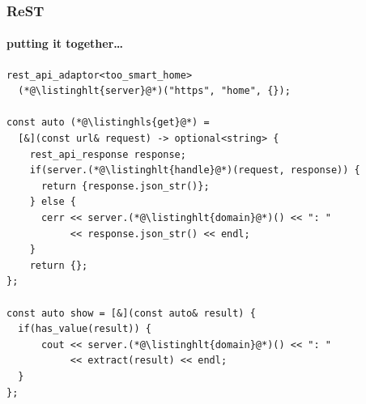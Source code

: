 \documentclass[compress,table,xcolor=table]{beamer}
\begin{document}
\begin{frame}[fragile]
  \frametitle{ReST}
  \framesubtitle{putting it together\ldots}
  \begin{lstlisting}[language=c++2x,basicstyle=\scriptsize\ttfamily]
rest_api_adaptor<too_smart_home>
  (*@\listinghlt{server}@*)("https", "home", {});

const auto (*@\listinghls{get}@*) =
  [&](const url& request) -> optional<string> {
    rest_api_response response;
    if(server.(*@\listinghlt{handle}@*)(request, response)) {
      return {response.json_str()};
    } else {
      cerr << server.(*@\listinghlt{domain}@*)() << ": "
           << response.json_str() << endl;
    }
    return {};
};

const auto show = [&](const auto& result) {
  if(has_value(result)) {
      cout << server.(*@\listinghlt{domain}@*)() << ": "
           << extract(result) << endl;
  }
};
  \end{lstlisting}
\end{frame}
\end{document}
